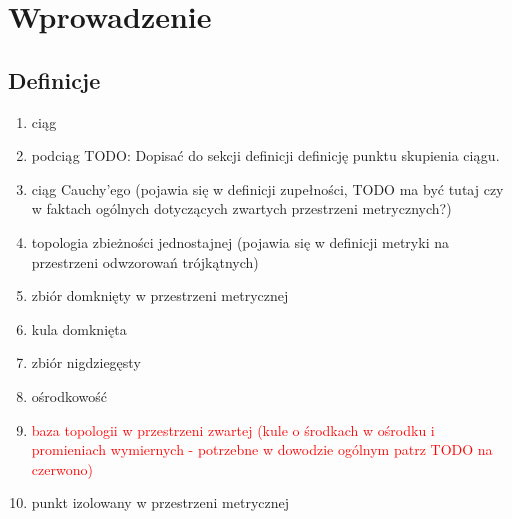 \documentclass[licencjacka]{pwr_wmat_praca_dyplomowa}
\theoremstyle{plain}
\numberwithin{theorem}{chapter}
\theoremstyle{definition}
\numberwithin{theorem}{chapter}
\begin{document}
\chapter{Wprowadzenie}

\section{Definicje}



\begin{enumerate}
\item ciąg
\item podciąg
TODO: Dopisać do sekcji definicji definicję punktu skupienia ciągu.
\item ciąg Cauchy'ego (pojawia się w definicji zupełności, TODO ma być tutaj czy w faktach ogólnych dotyczących zwartych przestrzeni metrycznych?)


\item topologia zbieżności jednostajnej (pojawia się w definicji metryki na przestrzeni odwzorowań trójkątnych)
\item zbiór domknięty w przestrzeni metrycznej
\item kula domknięta






\item zbiór nigdziegęsty
\item ośrodkowość
\item \textcolor{red}{baza topologii w przestrzeni zwartej (kule o środkach w ośrodku i promieniach wymiernych - potrzebne w dowodzie ogólnym patrz TODO na czerwono)}
\item punkt izolowany w przestrzeni metrycznej



\end{enumerate}
\end{document}
